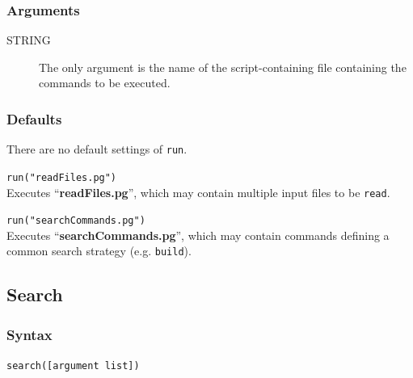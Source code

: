 	\subsubsection{Arguments}
		\begin{description} 
		\item[STRING] The only argument is the name of the script-containing file
		 containing the commands to be executed.
		\end{description}
		
	\subsubsection{Defaults}
		There are no default settings of \texttt{run}. 
	
	\begin{example}
		\item{\texttt{run("readFiles.pg")}\\ Executes ``\textbf{readFiles.pg}'', which 
		may contain multiple input files to be \texttt{read}.}
		
		\item{\texttt{run("searchCommands.pg")}\\ Executes ``\textbf{searchCommands.pg}'', 
		which may contain commands defining a common search strategy (e.g. 
		\texttt{build}).}
	\end{example}

\subsection{Search}
\label{subsec:search}
	\subsubsection{Syntax}
		\texttt{search([argument list])}
	
